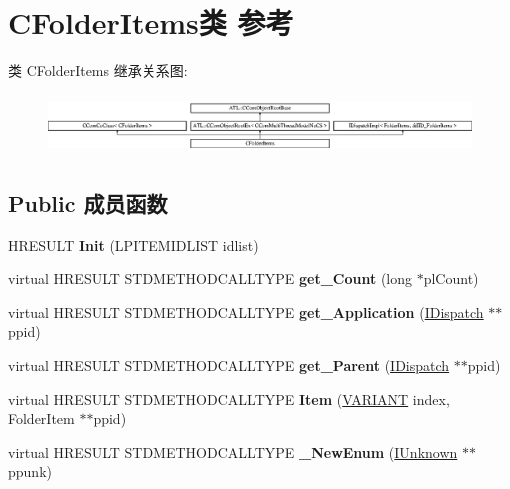 \hypertarget{class_c_folder_items}{}\section{C\+Folder\+Items类 参考}
\label{class_c_folder_items}
类 C\+Folder\+Items 继承关系图\+:\begin{figure}[H]
\begin{center}
\leavevmode
\includegraphics[height=1.590909cm]{class_c_folder_items}
\end{center}
\end{figure}
\subsection*{Public 成员函数}
\begin{DoxyCompactItemize}
\item 
\mbox{\label{class_c_folder_items_af0d569cd5ce6d84572843d20d933e6ec}} 
H\+R\+E\+S\+U\+LT {\bfseries Init} (L\+P\+I\+T\+E\+M\+I\+D\+L\+I\+ST idlist)
\item 
\mbox{\label{class_c_folder_items_a7e1a4ad27b15df4cca58cbe3e7d8a266}} 
virtual H\+R\+E\+S\+U\+LT S\+T\+D\+M\+E\+T\+H\+O\+D\+C\+A\+L\+L\+T\+Y\+PE {\bfseries get\+\_\+\+Count} (long $\ast$pl\+Count)
\item 
\mbox{\label{class_c_folder_items_a7b8e5f3c02791f2a1a0c17cdd0cd8a91}} 
virtual H\+R\+E\+S\+U\+LT S\+T\+D\+M\+E\+T\+H\+O\+D\+C\+A\+L\+L\+T\+Y\+PE {\bfseries get\+\_\+\+Application} (\hyperlink{interface_i_dispatch}{I\+Dispatch} $\ast$$\ast$ppid)
\item 
\mbox{\label{class_c_folder_items_ad66f97b3b1e4bf36129a0fe7b3141bd9}} 
virtual H\+R\+E\+S\+U\+LT S\+T\+D\+M\+E\+T\+H\+O\+D\+C\+A\+L\+L\+T\+Y\+PE {\bfseries get\+\_\+\+Parent} (\hyperlink{interface_i_dispatch}{I\+Dispatch} $\ast$$\ast$ppid)
\item 
\mbox{\label{class_c_folder_items_a1b8bbf553b7d8dbe7da5b178e8ac3a70}} 
virtual H\+R\+E\+S\+U\+LT S\+T\+D\+M\+E\+T\+H\+O\+D\+C\+A\+L\+L\+T\+Y\+PE {\bfseries Item} (\hyperlink{structtag_v_a_r_i_a_n_t}{V\+A\+R\+I\+A\+NT} index, Folder\+Item $\ast$$\ast$ppid)
\item 
\mbox{\label{class_c_folder_items_a6795e6c649bbd2ab86a8c6d656863919}} 
virtual H\+R\+E\+S\+U\+LT S\+T\+D\+M\+E\+T\+H\+O\+D\+C\+A\+L\+L\+T\+Y\+PE {\bfseries \+\_\+\+New\+Enum} (\hyperlink{interface_i_unknown}{I\+Unknown} $\ast$$\ast$ppunk)
\end{DoxyCompactItemize}
